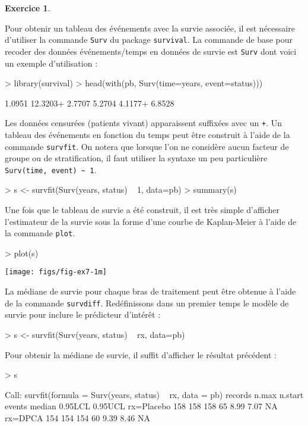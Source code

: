 \documentclass[11pt]{report}
\theoremstyle{definition}
\newtheorem{exo}{Exercice}[chapter]
\begin{document}
\begin{exo}
\begin{sol}
Pour obtenir un tableau des événements avec la survie associée, il est
nécessaire d'utiliser la commande \texttt{Surv} du package
\texttt{survival}. La commande de base pour recoder des données
événements/temps en données de survie est \texttt{Surv} dont voici un
exemple d'utilisation :
\begin{Schunk}
\begin{Sinput}
> library(survival)
> head(with(pb, Surv(time=years, event=status)))
\end{Sinput}
\begin{Soutput}
[1]  1.0951  12.3203+  2.7707   5.2704   4.1177+  6.8528 
\end{Soutput}
\end{Schunk}
Les données censurées (patients vivant) apparaissent suffixées avec un
\texttt{+}. Un tableau des événements en fonction du temps peut être
construit à l'aide de la commande \texttt{survfit}. On notera que lorsque
l'on ne considère aucun facteur de groupe ou de stratification, il faut
utiliser la syntaxe un peu particulière \verb|Surv(time, event) ~ 1|.
\begin{Schunk}
\begin{Sinput}
> s <- survfit(Surv(years, status) ~ 1, data=pb)
> summary(s)
\end{Sinput}
\end{Schunk}

Une fois que le tableau de survie a été construit, il est très simple
d'afficher l'estimateur de la survie sous la forme d'une courbe de
Kaplan-Meier à l'aide de la commande \texttt{plot}.
\begin{Schunk}
\begin{Sinput}
> plot(s)
\end{Sinput}
\end{Schunk}
\texttt{[image: figs/fig-ex7-1m]}

La médiane de survie pour chaque bras de traitement peut être obtenue à
l'aide de la commande \texttt{survdiff}. Redéfinissons dans un premier temps
le modèle de survie pour inclure le prédicteur d'intérêt :
\begin{Schunk}
\begin{Sinput}
> s <- survfit(Surv(years, status) ~ rx, data=pb)
\end{Sinput}
\end{Schunk}
Pour obtenir la médiane de survie, il suffit d'afficher le résultat
précédent :
\begin{Schunk}
\begin{Sinput}
> s
\end{Sinput}
\begin{Soutput}
Call: survfit(formula = Surv(years, status) ~ rx, data = pb)
           records n.max n.start events median 0.95LCL 0.95UCL
rx=Placebo     158   158     158     65   8.99    7.07      NA
rx=DPCA        154   154     154     60   9.39    8.46      NA
\end{Soutput}
\end{Schunk}


\end{sol}
\end{exo}
\end{document}
